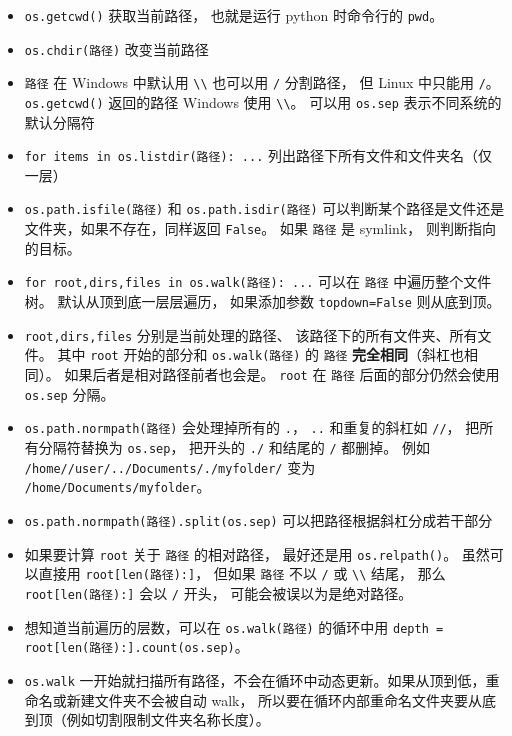 
\begin{itemize}
\item \verb`os.getcwd()` 获取当前路径， 也就是运行 python 时命令行的 \verb`pwd`。
\item \verb`os.chdir(路径)` 改变当前路径 
\item \verb`路径` 在 Windows 中默认用 \verb`\\` 也可以用 \verb`/` 分割路径， 但 Linux 中只能用 \verb`/`。 \verb`os.getcwd()` 返回的路径 Windows 使用 \verb`\\`。 可以用 \verb`os.sep` 表示不同系统的默认分隔符
\item \verb`for items in os.listdir(路径): ...` 列出路径下所有文件和文件夹名（仅一层）
\item \verb`os.path.isfile(路径)` 和 \verb`os.path.isdir(路径)` 可以判断某个路径是文件还是文件夹，如果不存在，同样返回 \verb`False`。 如果 \verb`路径` 是 symlink， 则判断指向的目标。
\item \verb`for root,dirs,files in os.walk(路径): ...` 可以在 \verb`路径` 中遍历整个文件树。 默认从顶到底一层层遍历， 如果添加参数 \verb`topdown=False` 则从底到顶。
\item \verb`root,dirs,files` 分别是当前处理的路径、 该路径下的所有文件夹、所有文件。 其中 \verb`root` 开始的部分和 \verb`os.walk(路径)` 的 \verb`路径` \textbf{完全相同}（斜杠也相同）。 如果后者是相对路径前者也会是。 \verb`root` 在 \verb`路径` 后面的部分仍然会使用 \verb`os.sep` 分隔。
\item \verb`os.path.normpath(路径)` 会处理掉所有的 \verb`.`， \verb`..` 和重复的斜杠如 \verb`//`， 把所有分隔符替换为 \verb`os.sep`， 把开头的 \verb`./` 和结尾的 \verb`/` 都删掉。 例如 \verb`/home//user/../Documents/./myfolder/` 变为 \verb`/home/Documents/myfolder`。
\item \verb`os.path.normpath(路径).split(os.sep)` 可以把路径根据斜杠分成若干部分
\item 如果要计算 \verb`root` 关于 \verb`路径` 的相对路径， 最好还是用 \verb`os.relpath()`。 虽然可以直接用 \verb`root[len(路径):]`， 但如果 \verb`路径` 不以 \verb`/` 或 \verb`\\` 结尾， 那么 \verb`root[len(路径):]` 会以 \verb`/` 开头， 可能会被误以为是绝对路径。
\item 想知道当前遍历的层数，可以在 \verb`os.walk(路径)` 的循环中用 \verb`depth = root[len(路径):].count(os.sep)`。
\item \verb`os.walk` 一开始就扫描所有路径，不会在循环中动态更新。如果从顶到低，重命名或新建文件夹不会被自动 walk， 所以要在循环内部重命名文件夹要从底到顶（例如切割限制文件夹名称长度）。

\end{itemize}
